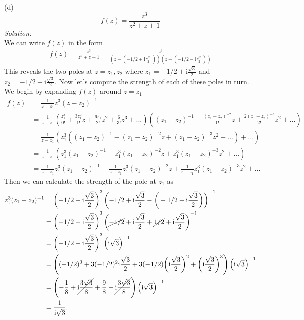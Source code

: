 \documentclass[10pt]{amsart}
\newcommand{\I}{\mathrm{i}}
\theoremstyle{nonumberplain}
\begin{document}
\begin{enumerate}[label={\bf {\arabic*}:}]
\noindent
(d)
$$
f(z) = \frac {z^3}{z^2 + z + 1}
$$
\textit{Solution:} \\
We can write $f(z)$ in the form
\begin{align*}
f(z) = \frac {z^3}{z^2 + z + 1} = \frac {z^3}{\left( z - \left(-1/2 + \I\frac{\sqrt{3}}{2} \right) \right)\left( z - \left(-1/2 - \I\frac{\sqrt{3}}{2} \right)\right)}
\end{align*}
This reveals the two poles at $z=z_1,z_2$ where $z_1= -1/2 + \I\frac{\sqrt{3}}{2}$ and $z_2= -1/2 - \I\frac{\sqrt{3}}{2}$.
Now let's compute the strength of each of these poles in turn.
We begin by expanding $f(z)$ around $z=z_1$
\begin{align*}
f(z) &= \frac {1}{ z - z_1}z^3( z - z_2)^{-1} \\
	&= \frac {1}{ z - z_1}
		\left(\frac{z_1^3}{0!} + \frac{3z_1^2}{1!} z + \frac{6z_1}{2!}z^2 + \frac 6 {3!} z^3 + ... \right)
		\left((z_1 - z_2)^{-1} - \frac {( z_1 - z_2)^{-2}}{1!}z + \frac {2 ( z_1 - z_2)^{-3}}{2!}z^2  + ...\right) \\
	&= \frac {1}{ z - z_1}
		\left( z_1^3 \left((z_1 - z_2)^{-1} - ( z_1 - z_2)^{-2}z + ( z_1 - z_2)^{-3}z^2  + ...\right) + ... \right) \\
	&= \frac {1}{ z - z_1}
		\left( z_1^3(z_1 - z_2)^{-1} - z_1^3( z_1 - z_2)^{-2}z + z_1^3( z_1 - z_2)^{-3}z^2  + ... \right) \\
	&= \frac {1}{ z - z_1} z_1^3(z_1 - z_2)^{-1} - \frac {1}{ z - z_1} z_1^3( z_1 - z_2)^{-2}z + \frac {1}{ z - z_1} z_1^3( z_1 - z_2)^{-3}z^2  + ...
\end{align*}
Then we can calculate the strength of the pole at $z_1$ as
\begin{align*}
z_1^3(z_1 - z_2)^{-1}
	&= \left(-1/2 + \I\frac{\sqrt{3}}{2}\right)^3 \left(-1/2 + \I\frac{\sqrt{3}}{2} - \bigg(-1/2 - \I\frac{\sqrt{3}}{2}\bigg) \right)^{-1} \\
	&= \left(-1/2 + \I\frac{\sqrt{3}}{2}\right)^3 \left(\cancel{-1/2} + \I\frac{\sqrt{3}}{2} + \cancel{1/2} + \I\frac{\sqrt{3}}{2}\right)^{-1} \\
	&= \left(-1/2 + \I\frac{\sqrt{3}}{2}\right)^3 \left(\I\sqrt{3}\right)^{-1} \\
	&= \left( (-1/2)^3 + 3(-1/2)^2\I\frac{\sqrt{3}}{2} + 3(-1/2)\bigg(\I\frac{\sqrt{3}}{2}\bigg)^2 + \bigg(\I\frac{\sqrt{3}}{2}\bigg)^3 \right) \left(\I\sqrt{3}\right)^{-1} \\
	&=\left(  -\frac 1 8 + \cancel{\I\frac{3\sqrt{3}}{8}} + \frac{9}{8} - \cancel{ \I \frac{3\sqrt{3}}{8}} \right) \left(\I\sqrt{3}\right)^{-1} \\
	&= \frac 1 {\I \sqrt{3}}.
\end{align*}


\end{enumerate}
\end{document}
